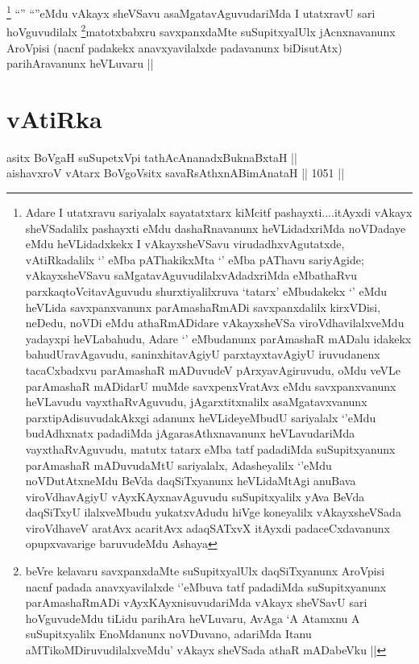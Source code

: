 \begin{artha}
\footnote{Adare I utatxravu sariyalalx sayatatxtarx kiMcitf pashayxti....itAyxdi vAkayx sheVSadalilx pashayxti eMdu dashaRnavanunx heVLidadxriMda noVDadaye eMdu heVLidadxkekx I vAkayxsheVSavu virudadhxvAgutatxde, vAtiRkadalilx `\stext' eMba pAThakikxMta `\stext' eMba pAThavu sariyAgide; vAkayxsheVSavu saMgatavAguvudilalxvAdadxriMda eMbathaRvu parxkaqtoVcitavAguvudu shurxtiyalilxruva `tatarx' eMbudakekx `\stext' eMdu heVLida savxpanxvanunx parAmashaRmADi savxpanxdalilx kirxVDisi, neDedu, noVDi eMdu athaRmADidare vAkayxsheVSa viroVdhavilalxveMdu yadayxpi heVLabahudu, Adare `\stext' eMbudanunx parAmashaR mADalu idakekx bahudUravAgavudu, saninxhitavAgiyU parxtayxtavAgiyU iruvudanenx tacaCxbadxvu parAmashaR mADuvudeV pArxyavAgiruvudu, oMdu veVLe parAmashaR mADidarU muMde savxpenxVratAvx eMdu savxpanxvanunx heVLavudu vayxthaRvAguvudu, jAgarxtitxnalilx asaMgatavxvanunx parxtipAdisuvudakAkxgi adanunx heVLideyeMbudU sariyalalx `\stext'eMdu budAdhxnatx padadiMda jAgarasAthxnavanunx heVLavudariMda vayxthaRvAguvudu, matutx tatarx eMba tatf padadiMda suSupitxyanunx parAmashaR mADuvudaMtU sariyalalx, Adasheyalilx `\stext'eMdu noVDutAtxneMdu BeVda daqSiTxyanunx heVLidaMtAgi anuBava viroVdhavAgiyU vAyxKAyxnavAguvudu suSupitxyalilx yAva BeVda daqSiTxyU ilalxveMbudu yukatxvAdudu hiVge koneyalilx vAkayxsheVSada viroVdhaveV aratAvx acaritAvx adaqSATxvX itAyxdi padaceCxdavanunx opupxvavarige baruvudeMdu Ashaya}
``\stext'' ``\stext''eMdu vAkayx sheVSavu asaMgatavAguvudariMda I utatxravU sari hoVguvudilalx \footnote{beVre kelavaru savxpanxdaMte suSupitxyalUlx daqSiTxyanunx AroVpisi nacnf padada anavxyavilalxde `\stext'eMbuva tatf padadiMda suSupitxyanunx parAmashaRmADi vAyxKAyxnisuvudariMda vAkayx sheVSavU sari hoVguvudeMdu tiLidu parihAra heVLuvaru, AvAga `A Atamxnu A suSupitxyalilx EnoMdanunx noVDuvano, adariMda Itanu aMTikoMDiruvudilalxveMdu' vAkayx sheVSada athaR mADabeVku ||}matotxbabxru savxpanxdaMte suSupitxyalUlx jAcnxnavanunx AroVpisi (nacnf padakekx anavxyavilalxde padavanunx biDisutAtx) parihAravanunx heVLuvaru ||
\end{artha}

\section*{vAtiRka}


\begin{shl}
asitx BoVgaH suSupetxV\s pi tathAcA\s \s nanadxBuknaBxtaH || \\
aishavxroV vA\s tarx BoVgoV\s sitx savaRsAthxnABimAnataH ||  1051 ||  
\end{shl}

